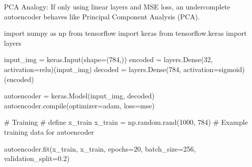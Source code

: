 \documentclass[
  letterpaper,
  DIV=11,
  numbers=noendperiod]{scrreprt}
\newenvironment{Shaded}{\begin{snugshade}}{\end{snugshade}}
\newcommand{\BuiltInTok}[1]{\textcolor[rgb]{0.00,0.23,0.31}{#1}}
\newcommand{\CommentTok}[1]{\textcolor[rgb]{0.37,0.37,0.37}{#1}}
\newcommand{\DecValTok}[1]{\textcolor[rgb]{0.68,0.00,0.00}{#1}}
\newcommand{\FloatTok}[1]{\textcolor[rgb]{0.68,0.00,0.00}{#1}}
\newcommand{\ImportTok}[1]{\textcolor[rgb]{0.00,0.46,0.62}{#1}}
\newcommand{\NormalTok}[1]{\textcolor[rgb]{0.00,0.23,0.31}{#1}}
\newcommand{\OperatorTok}[1]{\textcolor[rgb]{0.37,0.37,0.37}{#1}}
\newcommand{\StringTok}[1]{\textcolor[rgb]{0.13,0.47,0.30}{#1}}
\begin{document}
PCA Analogy: If only using linear layers and MSE loss, an undercomplete
autoencoder behaves like Principal Component Analysis (PCA).

\begin{Shaded}
\begin{Highlighting}[]
\ImportTok{import}\NormalTok{ numpy }\ImportTok{as}\NormalTok{ np}
\ImportTok{from}\NormalTok{ tensorflow }\ImportTok{import}\NormalTok{ keras}
\ImportTok{from}\NormalTok{ tensorflow.keras }\ImportTok{import}\NormalTok{ layers}

\NormalTok{input\_img }\OperatorTok{=}\NormalTok{ keras.Input(shape}\OperatorTok{=}\NormalTok{(}\DecValTok{784}\NormalTok{,))}
\NormalTok{encoded }\OperatorTok{=}\NormalTok{ layers.Dense(}\DecValTok{32}\NormalTok{, activation}\OperatorTok{=}\StringTok{\textquotesingle{}relu\textquotesingle{}}\NormalTok{)(input\_img)}
\NormalTok{decoded }\OperatorTok{=}\NormalTok{ layers.Dense(}\DecValTok{784}\NormalTok{, activation}\OperatorTok{=}\StringTok{\textquotesingle{}sigmoid\textquotesingle{}}\NormalTok{)(encoded)}

\NormalTok{autoencoder }\OperatorTok{=}\NormalTok{ keras.Model(input\_img, decoded)}
\NormalTok{autoencoder.}\BuiltInTok{compile}\NormalTok{(optimizer}\OperatorTok{=}\StringTok{\textquotesingle{}adam\textquotesingle{}}\NormalTok{, loss}\OperatorTok{=}\StringTok{\textquotesingle{}mse\textquotesingle{}}\NormalTok{)}

\CommentTok{\# Training}
\CommentTok{\# define x\_train}
\NormalTok{x\_train }\OperatorTok{=}\NormalTok{ np.random.rand(}\DecValTok{1000}\NormalTok{, }\DecValTok{784}\NormalTok{)  }\CommentTok{\# Example training data for autoencoder}


\NormalTok{autoencoder.fit(x\_train, x\_train, epochs}\OperatorTok{=}\DecValTok{20}\NormalTok{, batch\_size}\OperatorTok{=}\DecValTok{256}\NormalTok{, validation\_split}\OperatorTok{=}\FloatTok{0.2}\NormalTok{)}
\end{Highlighting}
\end{Shaded}
\end{document}
